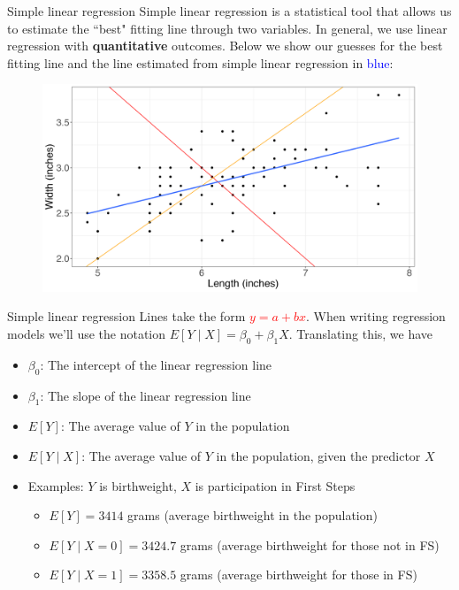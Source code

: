 \documentclass[10pt,t]{beamer}
\begin{document}
\begin{frame}{Simple linear regression}
Simple linear regression is a statistical tool that allows us to estimate the ``best" fitting line through two variables. In general, we use linear regression with \textbf{quantitative} outcomes. Below we show our guesses for the best fitting line and the line estimated from simple linear regression in \textcolor{blue}{blue}:

\begin{figure}
	\centering \includegraphics[scale=0.35]{points4.png}
\end{figure}

\end{frame}

\begin{frame}{Simple linear regression}
Lines take the form \textcolor{red}{$y = a + bx$}. When writing regression models we'll use the notation $E[Y \mid X] = \beta_0 + \beta_1 X$. Translating this, we have

\vspace{0.3cm}

\begin{itemize}
	\item $\beta_0$: The intercept of the linear regression line
	\item $\beta_1$: The slope of the linear regression line
	\item $E[Y]$: The average value of $Y$ in the population
	\item $E[Y \mid X]$: The average value of $Y$ in the population, given the predictor $X$ \pause
	\item Examples: $Y$ is birthweight, $X$ is participation in First Steps
	\begin{itemize}
		\item $E[Y] = 3414$ grams (average birthweight in the population)
		\item $E[Y \mid X = 0] = 3424.7$ grams (average birthweight for those not in FS)
		\item $E[Y \mid X = 1] = 3358.5$ grams (average birthweight for those in FS)
	\end{itemize}
\end{itemize}
\end{frame}
\end{document}
